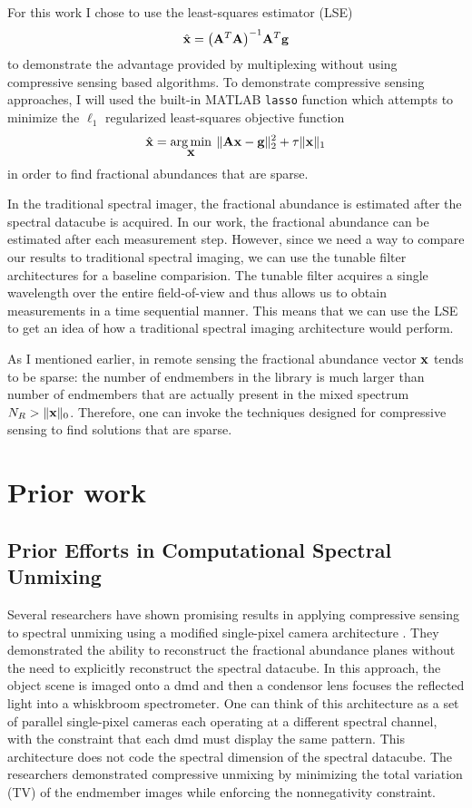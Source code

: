 For this work I chose to use the least-squares estimator (LSE)
%
\begin{equation}
	\mbh{x} = \ap{ \mb{A}^T \mb{A} }^{-1} \mb{A}^T \mb{g}
\end{equation}\label{eq:lseEquationChap5}
%
to demonstrate the advantage provided by multiplexing without using compressive sensing based algorithms. To demonstrate compressive sensing approaches, I will used the built-in MATLAB \texttt{lasso} function which attempts to minimize the $\ell_1$ regularized least-squares objective function 
%
\begin{equation}
	\hat{ \displaystyle \mathbf{x} } = \operatorname*{arg\,min}_{\displaystyle \mathbf{x}} \: \| \displaystyle \mathbf{Ax} - \displaystyle \mathbf{g} \|_{2}^{2} + \tau \| \displaystyle \mathbf{x} \|_1
	\label{eq:l1reglsV2}
\end{equation}
%
in order to find fractional abundances that are sparse. 

In the traditional spectral imager, the fractional abundance is estimated after the spectral datacube is acquired. In our work, the fractional abundance can be estimated after each measurement step. However, since we need a way to compare our results to traditional spectral imaging, we can use the tunable filter architectures for a baseline comparision. The tunable filter acquires a single wavelength over the entire field-of-view and thus allows us to obtain measurements in a time sequential manner. This means that we can use the LSE to get an idea of how a traditional spectral imaging architecture would perform.

As I mentioned earlier, in remote sensing the fractional abundance vector $\displaystyle \mathbf{x}$ tends to be sparse: the number of endmembers in the library is much larger than number of endmembers that are actually present in the mixed spectrum $N_{R} > \| \displaystyle \mathbf{x} \|_0$. Therefore, one can invoke the techniques designed for compressive sensing to find solutions that are sparse.

\section{Prior work}


\subsection{Prior Efforts in Computational Spectral Unmixing}

Several researchers have shown promising results in applying compressive sensing to spectral unmixing using a modified single-pixel camera architecture \cite{li2012compressive}. They demonstrated the ability to reconstruct the fractional abundance planes without the need to explicitly reconstruct the spectral datacube. In this approach, the object scene is imaged onto a \gls{dmd} and then a condensor lens focuses the reflected light into a whiskbroom spectrometer. One can think of this architecture as a set of parallel single-pixel cameras each operating at a different spectral channel, with the constraint that each \gls{dmd} must display the same pattern. This architecture does not code the spectral dimension of the spectral datacube. The researchers demonstrated compressive unmixing by minimizing the total variation (TV) of the endmember images while enforcing the nonnegativity constraint. 

